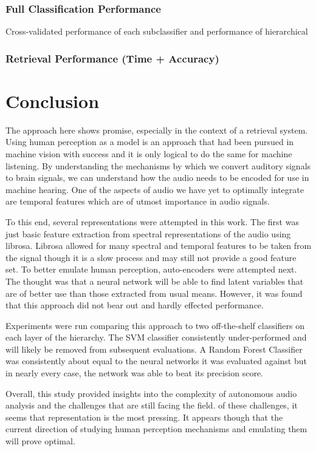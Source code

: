 \subsubsection{Full Classification Performance}

Cross-validated performance of each subclassifier and performance of hierarchical

\subsubsection{Retrieval Performance (Time + Accuracy)}


\section{Conclusion}
The approach here shows promise, especially in the context of a retrieval
system. Using human perception as a model is an approach that had been pursued
in machine vision with success and it is only logical to do the same for machine
listening. By understanding the mechanisms by which we convert auditory signals
to brain signals, we can understand how the audio needs to be encoded for use in
machine hearing. One of the aspects of audio we have yet to optimally integrate
are temporal features which are of utmost importance in audio signals.

To this end, several representations were attempted in this work. The first was
just basic feature extraction from spectral representations of the audio using
librosa. Librosa allowed for many spectral and temporal features to be taken
from the signal though it is a slow process and may still not provide a good
feature set. To better emulate human perception, auto-encoders were attempted
next. The thought was that a neural network will be able to find latent
variables that are of better use than those extracted from usual means. However,
it was found that this approach did not bear out and hardly effected
performance.

Experiments were run comparing this approach to two off-the-shelf classifiers on
each layer of the hierarchy. The SVM classifier consistently under-performed and
will likely be removed from subsequent evaluations. A Random Forest Classifier
was consistently about equal to the neural networks it was evaluated against but
in nearly every case, the network was able to beat its precision score.

Overall, this study provided insights into the complexity of autonomous audio
analysis and the challenges that are still facing the field. of these
challenges, it seems that representation is the most pressing. It appears though
that the current direction of studying human perception mechanisms and emulating
them will prove optimal.

